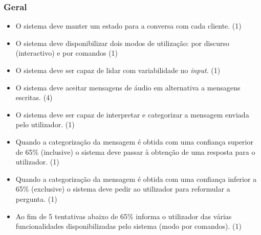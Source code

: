 \documentclass[11pt,a4paper]{article}
\newcommand{\requirement}[3]{
    #1 (#3)
}
\begin{document}
\begin{appendices}
\subsubsection{Geral}
\begin{itemize}
    \setlength\itemsep{0em}
    \item \requirement{O sistema deve manter um estado para a conversa com cada cliente.}
    {É necessário determinar o contexto de uma mensagem enviada pelo utilizador.}{1}
    \item \requirement{O sistema deve disponibilizar dois modos de utilização: por discurso (interactivo) e por comandos}
    {A existência de dois modos de utilização facilita a adopção do sistema por parte dos clientes ao abranger
    um maior número de tipos de cliente.}{1}
    \item \requirement{O sistema deve ser capaz de lidar com variabilidade no \textit{input}.}
    {O sistema deve ser capaz de lidar com coloquialidade inerente ao discurso.}{1}
    \item \requirement{O sistema deve aceitar mensagens de áudio em alternativa a mensagens escritas.}
    {Facilidade de interação com o utilizador.}{4}
    \item \requirement{O sistema deve ser capaz de interpretar e categorizar a mensagem enviada pelo utilizador.}
    {O sistema necessita de perceber que componentes necessita de usar para responder ao utilizador.}{1}
    \item \requirement{Quando a categorização da mensagem é obtida com uma confiança superior de 65\% (inclusive)
    o sistema deve passar à obtenção de uma resposta para o utilizador.}
    {Garantir que se conhece a categoria do problema para poder responder conforme a necessidade do utilizador.}{1}
    \item \requirement{Quando a categorização da mensagem é obtida com uma confiança inferior a 65\% (exclusive) 
    o sistema deve pedir ao utilizador para reformular a pergunta.}
    {Garantir que se conhece a categoria do problema para poder responder conforme a necessidade do utilizador.}{1}
    \item \requirement{Ao fim de 5 tentativas abaixo de 65\% informa o utilizador das várias funcionalidades 
    disponibilizadas pelo sistema (modo por comandos).}
    {Quando o sistema não consegue perceber o que o utilizador pretende consultar, a melhor solução passa por entrar 
    num modo em que as várias possibilidades (comandos) de cada área disponível são apresentadas por passos ao utilizador.}{1}

\end{itemize}
\end{appendices}
\end{document}
